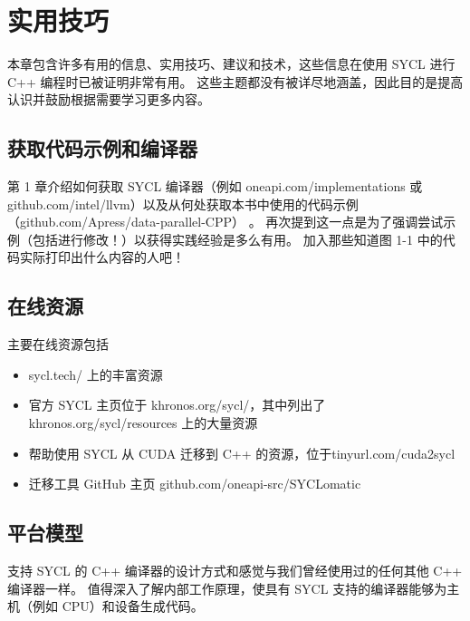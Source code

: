 \section{实用技巧}
本章包含许多有用的信息、实用技巧、建议和技术，这些信息在使用 SYCL 进行 C++ 编程时已被证明非常有用。 
这些主题都没有被详尽地涵盖，因此目的是提高认识并鼓励根据需要学习更多内容。

\subsection{获取代码示例和编译器}
第 1 章介绍如何获取 SYCL 编译器（例如 oneapi.com/implementations 
或 github.com/intel/llvm）以及从何处获取本书中使用的代码示例（github.com/Apress/data-parallel-CPP） 。 
再次提到这一点是为了强调尝试示例（包括进行修改！）以获得实践经验是多么有用。 
加入那些知道图 1-1 中的代码实际打印出什么内容的人吧！

\subsection{在线资源}
主要在线资源包括

\begin{itemize}
	\item sycl.tech/ 上的丰富资源

	\item 官方 SYCL 主页位于 khronos.org/sycl/，其中列出了 khronos.org/sycl/resources 上的大量资源

	\item 帮助使用 SYCL 从 CUDA 迁移到 C++ 的资源，位于tinyurl.com/cuda2sycl

	\item 迁移工具 GitHub 主页 github.com/oneapi-src/SYCLomatic
\end{itemize}

\subsection{平台模型}
支持 SYCL 的 C++ 编译器的设计方式和感觉与我们曾经使用过的任何其他 C++ 编译器一样。 
值得深入了解内部工作原理，使具有 SYCL 支持的编译器能够为主机（例如 CPU）和设备生成代码。

